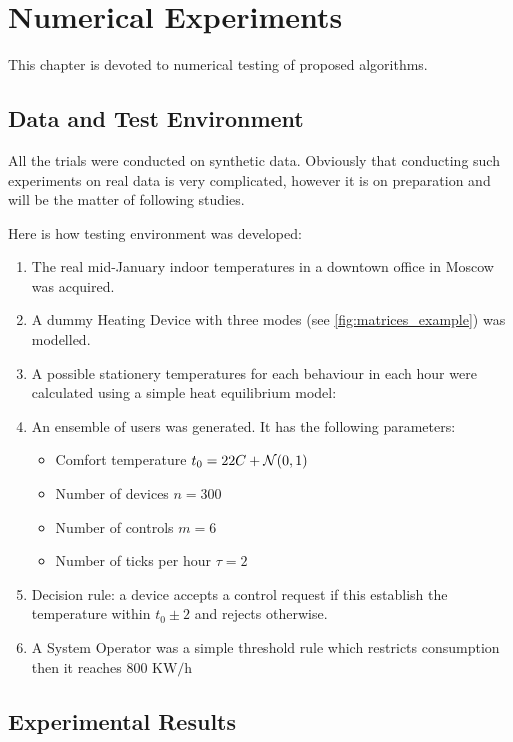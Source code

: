 \chapter{Numerical Experiments}
This chapter is devoted to numerical testing of proposed algorithms. 

\section{Data and Test Environment}
\label{sec:emulator}
All the trials were conducted on synthetic data. Obviously that conducting such experiments on real data is very complicated, however it is on preparation and will be the matter of following studies. 

Here is how testing environment was developed:
\begin{enumerate}
    \item The real mid-January indoor temperatures in a downtown office in Moscow was acquired. 
    \item A dummy Heating Device with three modes (see \ref{fig:matrices_example}) was modelled.
    \item A possible stationery temperatures for each behaviour in each hour were calculated using a simple heat equilibrium model: 
    \item An ensemble of users was generated. It has the following parameters:
        \begin{itemize}
            \item Comfort temperature $t_0 = 22 C +  \operatorname{\mathcal{N}}(0, 1)$ 
            \item Number of devices $n = 300$
            \item Number of controls $m = 6$
            \item Number of ticks per hour $\tau = 2$
        \end{itemize}
    \item Decision rule: a device accepts a control request if this establish the temperature within $t_0 \pm 2$ and rejects otherwise.
    \item A System Operator was a simple threshold rule which restricts consumption then it reaches $800 \text{ KW/h}$
        
\end{enumerate}

\section{Experimental Results}

